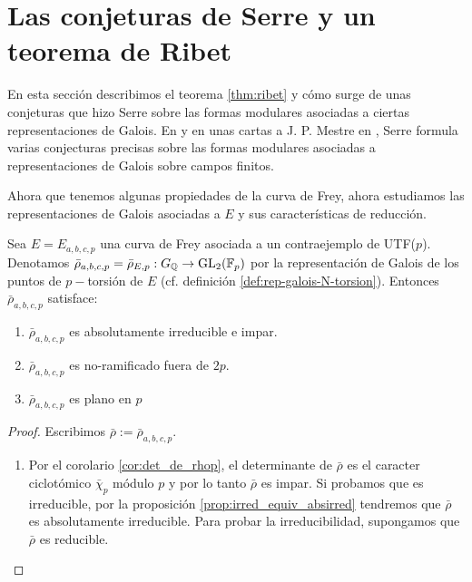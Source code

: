 \section{Las conjeturas de Serre y un teorema de Ribet}

En esta sección describimos el teorema \ref{thm:ribet} y cómo surge de unas conjeturas que hizo Serre sobre las formas modulares asociadas a ciertas representaciones de Galois. En \cite{Serre87} y en unas cartas a J. P. Mestre en \cite{lettreMestre}, Serre formula varias conjecturas precisas sobre las formas modulares asociadas a representaciones de Galois sobre campos finitos. 


Ahora que tenemos algunas propiedades de la curva de Frey, ahora estudiamos las representaciones de Galois asociadas a $E$ y sus características de reducción.

\begin{prop}
Sea $E=E_{a,b,c,p}$ una curva de Frey asociada a un contraejemplo de UTF($p$). Denotamos $\bar{\rho}_{a,b,c,p}=\bar{\rho}_{E,p}:G_{\mathbb{Q}}\rightarrow\mathrm{GL}_2(\mathbb{F}_p)$ por la representación de Galois de los puntos de $p-$torsión de $E$ (cf. definición \ref{def:rep-galois-N-torsion}). Entonces $\bar{\rho}_{a,b,c,p}$ satisface:
\begin{enumerate}[label=(\roman*)]
	\item $\bar{\rho}_{a,b,c,p}$ es absolutamente irreducible e impar.
	\item $\bar{\rho}_{a,b,c,p}$ es no-ramificado fuera de $2p$.
	\item $\bar{\rho}_{a,b,c,p}$ es plano en $p$
\end{enumerate}
\end{prop}

\begin{proof} Escribimos $\bar{\rho}:=\bar{\rho}_{a,b,c,p}$.
\begin{enumerate}[label=(\emph{\roman*})]
	\item Por el corolario \ref{cor:det_de_rhop}, el determinante de $\bar{\rho}$ es el caracter ciclotómico $\bar{\chi}_p$ módulo $p$ y por lo tanto $\bar{\rho}$ es impar. Si probamos que es irreducible, por la proposición \ref{prop:irred_equiv_absirred} tendremos que $\bar{\rho}$ es absolutamente irreducible. Para probar la irreducibilidad, supongamos que $\bar{\rho}$ es reducible.
\end{enumerate}
\end{proof}


